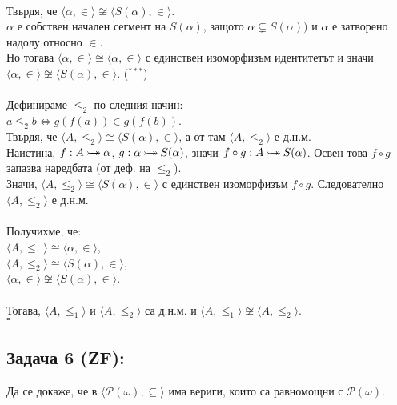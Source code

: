 \documentclass[french]{article}
\begin{document}
    \\
    Твърдя, че $\langle \alpha, \in \rangle \not\cong \langle S(\alpha), \in \rangle$. \\
    $\alpha$ е собствен начален сегмент на $S(\alpha)$, защото $\alpha \subsetneq S(\alpha))$ и $\alpha$ е затворено надолу относно $\in$. \\
    Но тогава $\langle \alpha, \in \rangle \cong \langle \alpha, \in \rangle$ с единствен изоморфизъм идентитетът и значи $\langle \alpha, \in \rangle \not\cong \langle S(\alpha), \in \rangle$. ($^{***}$) \\
    \\
    Дефинираме $\le_2$ по следния начин: \\
    $a \le_2 b \Longleftrightarrow g(f(a)) \in g(f(b))$. \\
    Твърдя, че $\langle A, \le_2 \rangle \cong \langle S(\alpha), \in  \rangle$, а от там $\langle A, \le_2 \rangle$ е д.н.м. \\
    Наистина, $f : A \mathbin{\rightarrowtail \hspace{-8pt} \twoheadrightarrow} \alpha$, $g : \alpha \mathbin{\rightarrowtail \hspace{-8pt} \twoheadrightarrow} S(\alpha)$, значи $f \circ g : A \mathbin{\rightarrowtail \hspace{-8pt} \twoheadrightarrow} S(\alpha)$. Освен това $f \circ g$ запазва наредбата (от деф. на $\le_2$). \\
    Значи, $\langle A, \le_2 \rangle \cong \langle S(\alpha), \in \rangle$ с единствен изоморфизъм $f \circ g$. Следователно $\langle A, \le_2 \rangle$ е д.н.м. \\
    \\
    Получихме, че: \\
    $\langle A, \le_1 \rangle \cong \langle \alpha, \in \rangle$, \\
    $\langle A, \le_2 \rangle \cong \langle S(\alpha), \in \rangle$, \\
    $\langle \alpha, \in \rangle \not\cong \langle S(\alpha), \in \rangle$. \\
    \\
    Тогава,  $\langle A, \le_1 \rangle$ и  $\langle A, \le_2 \rangle$ са д.н.м. и  $\langle A, \le_1 \rangle \not\cong \langle A, \le_2 \rangle$. \\
    $\square$
 
   
   	\subsection*{Задача 6 (ZF):}
   	Да се докаже, че в $\langle \mathcal{P}(\omega), \subseteq \rangle$ има вериги, които са равномощни с $\mathcal{P}(\omega)$.
   	
\end{document}
